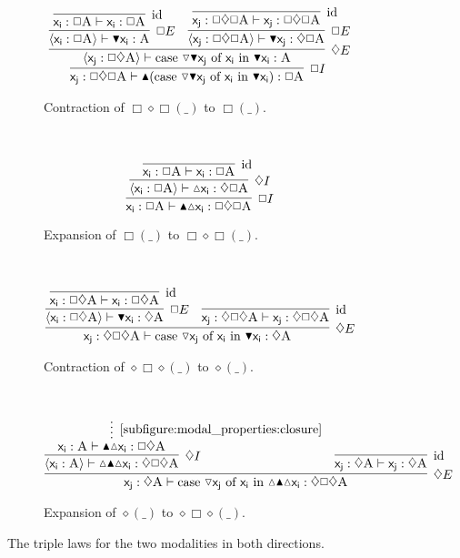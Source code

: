 \begin{figure}
	\centering
	\begin{subfigure}{1\textwidth}
		\[
			\infer[\Box I]{\term{x_j}: \Box\diamond\Box\prop{A} \vdash \boxintro(\caseof{\diaelim \boxelim x_j}{x_i}{\boxelim{x_i}}): \Box\prop{A}}{
				\infer[\diamond E]{\bracket{\term{x_j}: \Box\diamond \prop{A}} \vdash \caseof{\diaelim \boxelim x_j}{x_i}{\boxelim{x_i}}: \prop{A}}{
					\infer[\Box E]{\bracket{\term{x_i}: \Box \prop{A}} \vdash \term{\boxelim x_i}:\prop{A}}{
						\infer[\Ax]{\term{x_i}: \Box\prop{A} \vdash \term{x_i}: \Box\prop{A}}{}
					}
					&
					\infer[\Box E]{\bracket{\term{x_j}:\Box\diamond\Box\prop{A}} \vdash \term{\boxelim x_j}:\diamond\Box\prop{A}}{
						\infer[\Ax]{\term{x_j}: \Box\diamond\Box\prop{A}\vdash\term{x_j}:\Box\diamond\Box\prop{A}}{}
					}
				}
			}
		\]
		\caption{Contraction of $\Box\diamond\Box(\_)$ to $\Box(\_)$.}
		\label{subfigure:triple_law:box_collapse}
	\end{subfigure}\\[\midsep]
	\begin{subfigure}{1\textwidth}
		\[
			\infer[\Box I]{\term{x_i}:\Box\prop{A} \vdash \boxintro\diaintro\term{x_i}:\Box\diamond\Box\prop{A}}{
				\infer[\diamond I]{\bracket{\term{x_i}: \Box\prop{A}} \vdash \diaintro\term{x_i}:\diamond\Box\prop{A}}{
					\infer[\Ax]{\term{x_i}:\Box\prop{A}\vdash \term{x_i}:\Box\prop{A}}{}
				}
			}
		\]
		\caption{Expansion of $\Box(\_)$ to $\Box\diamond\Box(\_)$.}
		\label{subfigure:triple_law:box_expand}
	\end{subfigure}\\[\midsep]
	\begin{subfigure}{1\textwidth}
		\[
			\infer[\diamond E]{\term{x_j}:\diamond\Box\diamond\prop{A} \vdash \caseof{\diaelim x_j}{x_i}{\boxelim x_i}: \diamond\prop{A}}{
				\infer[\Box E]{\bracket{\term{x_i}: \Box\diamond\prop{A}} \vdash \boxelim\term{x_i}: \diamond\prop{A}}{
					\infer[\Ax]{\term{x_i}: \Box\diamond\prop{A} \vdash \term{x_i}: \Box\diamond\prop{A}}{}
				}
				&
				\infer[\Ax]{\term{x_j}: \diamond\Box\diamond\prop{A} \vdash \term{x_j}: \diamond\Box\diamond\prop{A}}{}
			}
		\]
		\caption{Contraction of $\diamond\Box\diamond(\_)$ to $\diamond(\_)$.}
		\label{subfigure:triple_law:diamond_collapse}
	\end{subfigure}\\[\midsep]
	\begin{subfigure}{1\textwidth}
		\[
			\infer[\diamond E]{\term{x_j}: \diamond \prop{A} \vdash \caseof{\diaelim x_j}{x_i}{\diaintro\boxintro\diaintro x_i}:\diamond\Box\diamond\prop{A}}{
				\infer[\diamond I]{\bracket{\term{x_i}:\prop{A}} \vdash \diaintro\boxintro\diaintro\term{x_i}:\diamond\Box\diamond\prop{A}}{
					\infer*[\text{\ref{subfigure:modal_properties:closure}}]{\term{x_i}: \prop{A} \vdash \boxintro\diaintro\term{x_i}: \Box\diamond\prop{A}}{}
				}
				&
				\infer[\Ax]{\term{x_j}: \diamond \prop{A} \vdash \term{x_j}:\diamond\prop{A}}{}
			}
		\]
		\caption{Expansion of $\diamond(\_)$ to $\diamond\Box\diamond(\_)$.}
		\label{subfigure:triple_law:diamond_expand}
	\end{subfigure}
	\caption{The triple laws for the two modalities in both directions.}
	\label{figure:modal_triple_laws}
\end{figure}

